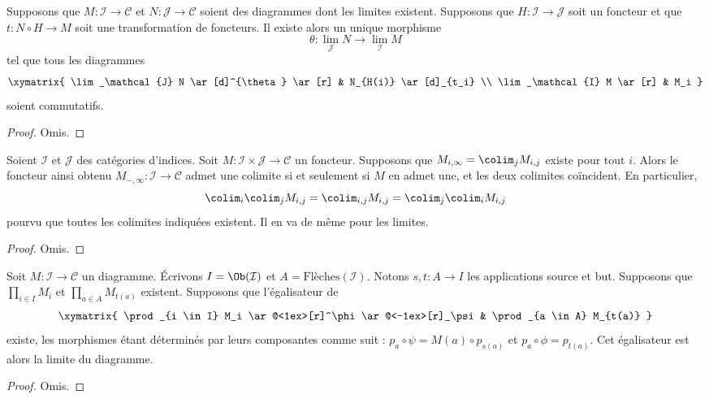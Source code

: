 \begin{lemma}
\label{lemma-functorial-limit}
Supposons que $M : \mathcal{I} \to \mathcal{C}$
et $N : \mathcal{J} \to \mathcal{C}$ soient des diagrammes
dont les limites existent. Supposons que
$H : \mathcal{I} \to \mathcal{J}$ soit un foncteur et que
$t : N \circ H \to M$ soit une transformation de foncteurs.
Il existe alors un unique morphisme
$$
\theta :
\lim_\mathcal{J} N
\longrightarrow
\lim_\mathcal{I} M
$$
tel que tous les diagrammes
$$
\xymatrix{
\lim_\mathcal{J} N \ar[d]^{\theta} \ar[r]
&
N_{H(i)} \ar[d]_{t_i}
\\
\lim_\mathcal{I} M \ar[r]
&
M_i
}
$$
soient commutatifs.
\end{lemma}

\begin{proof}
Omis.
\end{proof}


\begin{lemma}
\label{lemma-colimits-commute}
Soient $\mathcal{I}$ et $\mathcal{J}$ des catégories d'indices. Soit
$M : \mathcal{I} \times \mathcal{J} \to \mathcal{C}$ un foncteur.
Supposons que $M_{i, \infty} = \colim_j M_{i,j}$
existe pour tout $i$. Alors le foncteur ainsi obtenu
$M_{-, \infty} : \mathcal{I} \to \mathcal{C}$
admet une colimite si et seulement si $M$ en admet une, et les deux
colimites coïncident. En particulier,
$$
\colim_i \colim_j M_{i, j}
=
\colim_{i, j} M_{i, j}
=
\colim_j \colim_i M_{i, j}
$$
pourvu que toutes les colimites indiquées existent. Il en va de même
pour les limites.
\end{lemma}

\begin{proof}
Omis.
\end{proof}

\begin{lemma}
\label{lemma-limits-products-equalizers}
Soit $M : \mathcal{I} \to \mathcal{C}$ un diagramme.
Écrivons $I = \Ob(\mathcal{I})$ et $A = \text{Flèches}(\mathcal{I})$.
Notons $s, t : A \to I$ les applications source et but.
Supposons que $\prod_{i \in I} M_i$ et $\prod_{a \in A} M_{t(a)}$
existent. Supposons que l'égalisateur de
$$
\xymatrix{
\prod_{i \in I} M_i
\ar@<1ex>[r]^\phi \ar@<-1ex>[r]_\psi
&
\prod_{a \in A} M_{t(a)}
}
$$
existe, les morphismes étant déterminés par leurs composantes
comme suit : $p_a \circ \psi = M(a) \circ p_{s(a)}$
et $p_a \circ \phi = p_{t(a)}$. Cet égalisateur est alors la
limite du diagramme.
\end{lemma}

\begin{proof}
Omis.
\end{proof}


